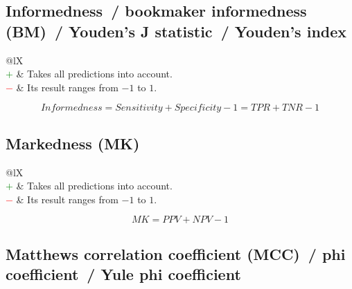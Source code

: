 \documentclass{article}
\begin{document}
\subsection[Informedness~/ bookmaker informedness (BM)~/ Youden's J statistic~/ Youden's index]{Informedness~/ bookmaker informedness (BM)~/ Youden's J statistic~/ Youden's index \cite{peirce1884numerical, youden1950index}}

\begin{table}[H]\centering
	\begin{tabularx}{\textwidth}{@{}lX}
		 \\
		\textcolor{Green}{$+$} & Takes all predictions into account. \\
		\textcolor{Red}{$-$}   & Its result ranges from $-1$ to $1$.
	\end{tabularx}
\end{table}

\begin{equation}
	\textit{Informedness} = \textit{Sensitivity} + \textit{Specificity} - 1 = \textit{TPR} + \textit{TNR} - 1
%
	\label{equation:informedness}
\end{equation}


\subsection[Markedness (MK)]{Markedness (MK) \cite{powers2020evaluation}}

\begin{table}[H]\centering
	\begin{tabularx}{\textwidth}{@{}lX}
		 \\
		\textcolor{Green}{$+$} & Takes all predictions into account. \\
		\textcolor{Red}{$-$}   & Its result ranges from $-1$ to $1$.
	\end{tabularx}
\end{table}

\begin{equation}
	\textit{MK} = \textit{PPV} + \textit{NPV} - 1
%
	\label{equation:MK}
\end{equation}


\subsection[Matthews correlation coefficient (MCC)~/ phi coefficient~/ Yule phi coefficient]{Matthews correlation coefficient (MCC)~/ phi coefficient~/ Yule phi coefficient \cite{yule1912methods, matthews1975comparison, cramer1999mathematical}}
\end{document}

